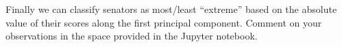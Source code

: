 \begin{enumerate}
	\sol{  
	}
	\qitem
	Finally we can classify senators as most/least ``extreme'' based on the absolute value of their scores along the first principal component. Comment on your observations in the space provided in the Jupyter notebook.
		
	\sol{  
	}

\end{enumerate}